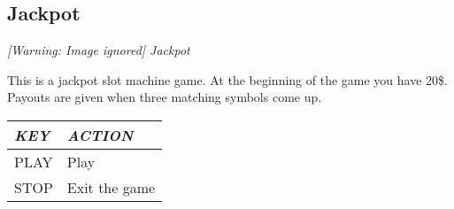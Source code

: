 \subsection{Jackpot}
{\centering\itshape
  [Warning: Image ignored] %
 \newline
Jackpot
\par}

This is a jackpot slot machine game. At the beginning of the game you
have 20\$.  Payouts are given when three matching symbols come up.

\begin{tabular}[c]{|p{4.7780004cm}|p{4.2770004cm}|}
\hline
{\centering\bfseries\itshape
KEY
\par}
&
{\centering\bfseries\itshape
ACTION
\par}
\\\hline
{\centering
PLAY
\par}
&
Play
\\\hline
{\centering
STOP
\par}
&
Exit the game
\\\hline
\end{tabular}



